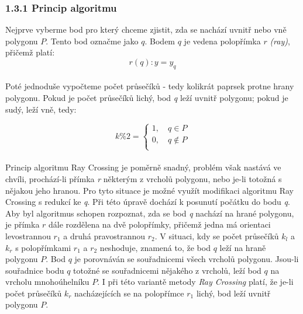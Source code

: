 \subsubsection*{1.3.1 Princip algoritmu}
Nejprve vyberme bod pro který chceme zjistit, zda se nachází uvnitř nebo vně polygonu $P$. Tento bod označme jako $q$. Bodem $q$ je vedena polopřímka $r$ \textit{(ray)}, přičemž platí:\\

\begin{equation*}
r(q):y=y_q
\end{equation*}\\
Poté jednoduše vypočteme počet průsečíků - tedy kolikrát paprsek protne hrany polygonu. Pokud je počet průsečíků lichý, bod \textit{q} leží uvnitř polygonu; pokud je sudý, leží vně, tedy: 

\begin{equation*}
k\%2=\begin{cases}
    1, \quad q  \in P\\\textbf{}
    0, \quad q  \notin P\\
    \end{cases}
\end{equation*}\\

\noindent Princip algoritmu Ray Crossing je poměrně snadný, problém však nastává ve chvíli, prochází-li přímka \textit{r} některým z vrcholů polygonu, nebo je-li totožná s nějakou jeho hranou. Pro tyto situace je možné využít modifikaci algoritmu Ray Crossing s redukcí ke \textit{q}. Při této úpravě dochází k posunutí počátku do bodu \textit{q}. Aby byl algoritmus schopen rozpoznat, zda se bod \textit{q} nachází na hrané polygonu, je přímka $r$ dále rozdělena na dvě polopřímky, přičemž jedna má orientaci levostrannou $r_1$ a druhá pravostrannou $r_2$. V situaci, kdy se počet průsečíků $k_l$ a $k_r$ s polopřímkami $r_1$ a $r_2$ neshoduje, znamená to, že bod $q$ leží na hraně polygonu $P$. Bod $q$ je porovnáván se souřadnicemi všech vrcholů polygonu. Jsou-li souřadnice bodu $q$ totožné se souřadnicemi nějakého z vrcholů, leží bod $q$ na vrcholu mnohoúhelníku $P$. I při této variantě metody \textit{Ray Crossing} platí, že je-li počet průsečíků $k_r$ nacházejících se na polopřímce $r_1$ lichý, bod leží uvnitř polygonu $P$.


